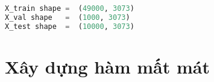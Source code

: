 \kq 
\begin{lstlisting}[language=Python]
X_train shape =  (49000, 3073)
X_val shape   =  (1000, 3073)
X_test shape  =  (10000, 3073)
\end{lstlisting}
\section{Xây dựng hàm mất mát }
 
 


 
 
 
 
